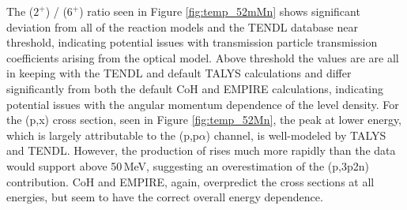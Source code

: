 The  ($2^+$) /   ($6^+$) ratio seen in Figure \autoref{fig:temp_52mMn} shows significant deviation from all of the reaction models and the TENDL database near threshold, indicating potential issues with transmission particle transmission coefficients arising from the optical model.  
Above threshold the values are are all in keeping with the TENDL and default TALYS calculations and differ significantly from both the default CoH and EMPIRE calculations, indicating potential issues with the angular momentum dependence of the level density.
%
For the (p,x) cross section, seen in Figure \autoref{fig:temp_52Mn},  the  peak  at lower energy, which is largely attributable to the (p,p$\alpha$) channel, is well-modeled by TALYS and TENDL.
However, the production of   rises much more rapidly than the data would support above 50\,MeV, suggesting an overestimation of the (p,3p2n) contribution.  
CoH and EMPIRE, again, overpredict the cross sections at all energies, but seem to have the correct overall energy dependence.




